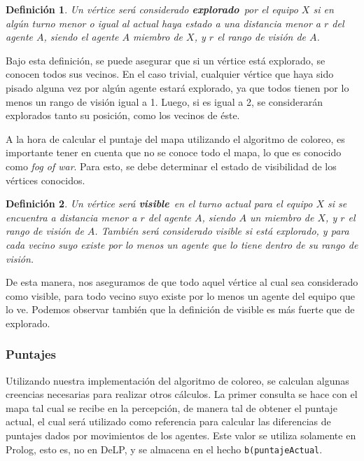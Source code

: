 \documentclass[oneside]{book}
\newtheorem{definicion}{Definición}
\begin{document}
\begin{definicion}
Un vértice será considerado \textbf{explorado}\ por el equipo $X$ si en algún 
turno menor o igual al actual haya estado a una distancia menor a $r$ del agente
$A$, siendo el agente $A$ miembro de $X$, y $r$ el rango de visión de $A$.
\end{definicion}

Bajo esta definición, se puede asegurar que si un vértice está explorado, se 
conocen todos sus vecinos. En el caso trivial, cualquier vértice que haya sido
pisado alguna vez por algún agente estará explorado, ya que todos tienen por lo 
menos un rango de visión igual a 1. Luego, si es igual a 2, se considerarán
explorados tanto su posición, como los vecinos de éste.

A la hora de calcular el puntaje del mapa utilizando el algoritmo de coloreo,
es importante tener en cuenta que no se conoce todo el mapa, lo que es conocido 
como \textit{fog of war}. Para esto, se debe determinar el estado de visibilidad
de los vértices conocidos. 

\begin{definicion}
Un vértice será \textbf{visible}\ en el turno actual para el equipo $X$ si se 
encuentra a distancia 
menor a $r$ del agente $A$, siendo $A$ un miembro de $X$, y $r$ el rango de visión 
de $A$. También será considerado visible si está explorado, y para cada vecino suyo 
existe por lo menos un agente que lo tiene dentro de su rango de visión.
\end{definicion}

De esta manera, nos aseguramos de que todo aquel vértice al cual sea considerado 
como visible, para todo vecino suyo existe por lo menos un agente del equipo 
que lo ve. Podemos observar también que la definición de visible es más fuerte que
de explorado.


\subsubsection{Puntajes}

Utilizando nuestra implementación del algoritmo de coloreo, se calculan algunas
creencias necesarias para realizar otros cálculos. La primer consulta se hace con
el mapa tal cual se recibe en la percepción, de manera tal de obtener el puntaje
actual, el cual será utilizado como referencia para calcular las diferencias de
puntajes dados por movimientos de los agentes. Este valor se utiliza solamente
en Prolog, esto es, no en DeLP, y se almacena en el hecho \texttt{b(puntajeActual}.
\end{document}
